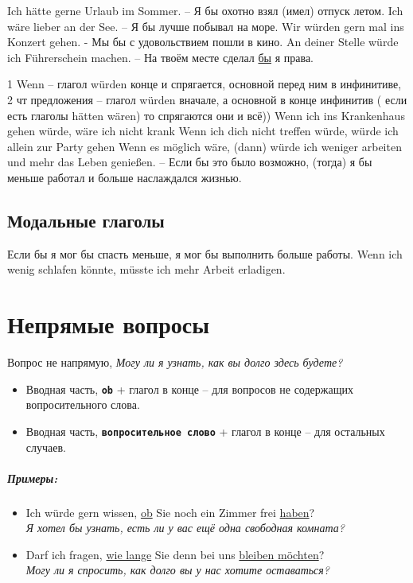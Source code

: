 \documentclass[12pt,a4paper]{report}
\newcommand{\term}[1]{\texttt{\textbf{#1}}}
\newcommand{\satzew}[1]{\underline{#1}}
\newcommand{\ubersatze}[1]{\textit{#1}}
\begin{document}
Ich hätte gerne Urlaub im Sommer. – Я бы охотно взял (имел) отпуск летом.
Ich wäre lieber an der See. – Я бы лучше побывал на море.
Wir würden gern mal ins Konzert gehen. - Мы бы с удовольствием пошли в кино.
An deiner Stelle würde ich Führerschein machen. – На твоём месте сделал \satzew{бы} я права.

1 Wenn – глагол würden  конце и спрягается, основной перед ним в инфинитиве,  2 чт предложения – глагол würden вначале, а основной в конце инфинитив ( если есть глаголы hätten wären) то спрягаются они и всё))
Wenn ich ins Krankenhaus gehen würde,  wäre ich nicht krank 
Wenn ich dich nicht treffen würde, würde ich allein zur Party gehen
Wenn es möglich wäre, (dann) würde ich weniger arbeiten und mehr das Leben genießen. – Если бы это было возможно, (тогда) я бы меньше работал и больше наслаждался жизнью.

\section{Модальные глаголы}

Если бы я мог бы спасть меньше, я мог бы выполнить больше работы.
Wenn ich wenig schlafen könnte, müsste ich mehr Arbeit erladigen.


\chapter{Непрямые вопросы}
Вопрос не напрямую, \ubersatze{Могу ли я узнать, как вы долго здесь будете?}

\begin{itemize}
 \item Вводная часть, \term{ob} + глагол в конце -- для вопросов не содержащих вопросительного слова.
 \item Вводная часть, \term{вопросительное слово} + глагол в конце -- для остальных случаев.
\end{itemize}

\paragraph{Примеры:}
\begin{itemize}
 \item Ich würde gern wissen, \satzew{ob} Sie noch ein Zimmer frei \satzew{haben}? 
 ~\\ \ubersatze{Я хотел бы узнать, есть ли у вас ещё одна свободная комната?}
 \item Darf ich fragen, \satzew{wie lange} Sie denn bei uns \satzew{bleiben möchten}? 
 ~\\ \ubersatze{Могу ли я спросить, как долго вы у нас хотите оставаться?}
\end{itemize}
\end{document}

